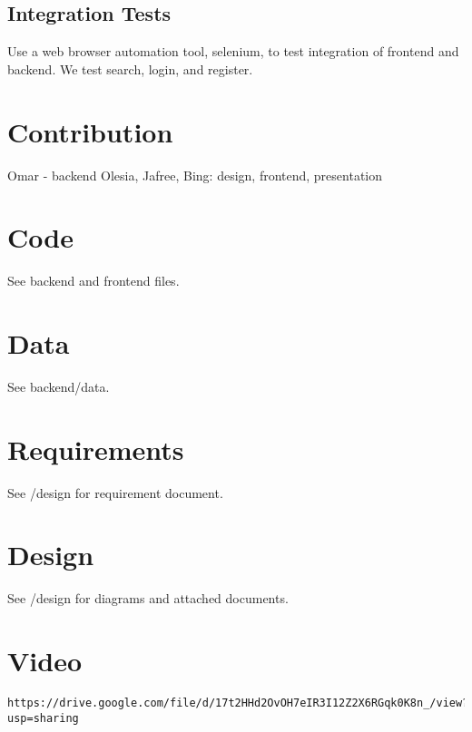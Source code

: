 \documentclass{article}
\begin{document}
\subsection{Integration Tests}
Use a web browser automation tool, selenium, to test integration of frontend and
backend. We test search, login, and register.

\section{Contribution}
Omar - backend 
Olesia, Jafree, Bing: design, frontend, presentation

\section{Code}
See backend and frontend files.

\section{Data}
See backend/data.

\section{Requirements}
See /design for requirement document. 

\section{Design}
See /design for diagrams and attached documents.

\section{Video}
\begin{verbatim}
https://drive.google.com/file/d/17t2HHd2OvOH7eIR3I12Z2X6RGqk0K8n_/view?usp=sharing
\end{verbatim}
\end{document}
